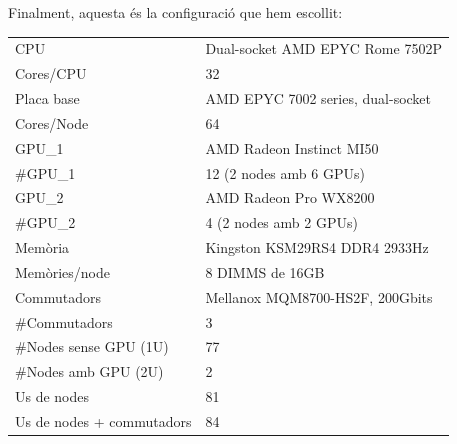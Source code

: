 \clearpage

Finalment, aquesta és la configuració que hem escollit:
\begin{table}[H]
\begin{adjustwidth}{-1.0in}{-1.0in}
\begin{center}
\begin{tabular}{l|l}
\hline
    {\cellcolor[HTML]{EFEFEF}CPU}         & {\cellcolor[HTML]{EFEFEF}Dual-socket AMD EPYC Rome 7502P \cite{cpu_amd_7502_buy}} \\ 
    Cores/CPU & 32 \\
    \rowcolor[HTML]{EFEFEF}
    Placa base & AMD EPYC 7002 series, dual-socket \cite{dualgpu}\cite{dualnogpu}  \\
Cores/Node                                       & 64                                             \\ 
    {\cellcolor[HTML]{EFEFEF}GPU\_1}                       & {\cellcolor[HTML]{EFEFEF}AMD Radeon Instinct MI50 \cite{gpu_mi50}} \\ 
\#GPU\_1                                           & 12 (2 nodes amb 6 GPUs)                         \\
    {\cellcolor[HTML]{EFEFEF}GPU\_2}                       & {\cellcolor[HTML]{EFEFEF}AMD Radeon Pro WX8200 \cite{gpu_pro_8200}} \\ 
\#GPU\_2                                           & 4 (2 nodes amb 2 GPUs)                         \\
    {\cellcolor[HTML]{EFEFEF}Memòria}     & {\cellcolor[HTML]{EFEFEF}Kingston KSM29RS4 DDR4 2933Hz \cite{mem2}}   \\
{\color[HTML]{000000}Memòries/node}             & {\color[HTML]{000000}8 DIMMS de 16GB}          \\ 
    {\cellcolor[HTML]{EFEFEF}Commutadors} & {\cellcolor[HTML]{EFEFEF}Mellanox MQM8700-HS2F, 200Gbits \cite{mellanox_mqm8700-hs2f}} \\ 
{\color[HTML]{000000}\#Commutadors}             & {\color[HTML]{000000}3}                        \\ 
{\cellcolor[HTML]{EFEFEF}\#Nodes sense GPU (1U)}    & {\cellcolor[HTML]{EFEFEF}77}                       \\
{\color[HTML]{000000}\#Nodes amb GPU (2U)}      & {\color[HTML]{000000}2}                        \\
{\cellcolor[HTML]{EFEFEF}Us de nodes}               & {\cellcolor[HTML]{EFEFEF}81}                       \\
{\color[HTML]{000000}Us de nodes + commutadors} & {\color[HTML]{000000}84}                       \\ \hline

\end{tabular}
\end{center}
\end{adjustwidth}
\end{table}

